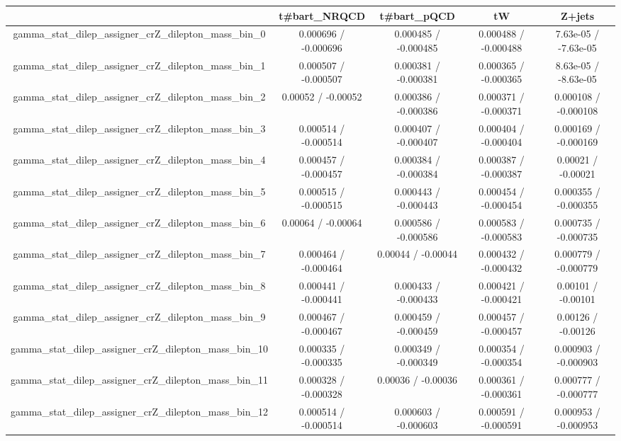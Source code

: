 \documentclass[10pt]{article}
\begin{document}
\begin{table}[htbp]
\begin{center}
\begin{tabular}{|c|c|c|c|c|}
\hline 
      & t#bar{t}_{NRQCD}      & t#bar{t}_{pQCD}      & tW      & Z+jets \\ 
\hline 
  gamma_stat_dilep_assigner_crZ_dilepton_mass_bin_0 & 0.000696 / -0.000696 & 0.000485 / -0.000485 & 0.000488 / -0.000488 & 7.63e-05 / -7.63e-05 \\ 
  gamma_stat_dilep_assigner_crZ_dilepton_mass_bin_1 & 0.000507 / -0.000507 & 0.000381 / -0.000381 & 0.000365 / -0.000365 & 8.63e-05 / -8.63e-05 \\ 
  gamma_stat_dilep_assigner_crZ_dilepton_mass_bin_2 & 0.00052 / -0.00052 & 0.000386 / -0.000386 & 0.000371 / -0.000371 & 0.000108 / -0.000108 \\ 
  gamma_stat_dilep_assigner_crZ_dilepton_mass_bin_3 & 0.000514 / -0.000514 & 0.000407 / -0.000407 & 0.000404 / -0.000404 & 0.000169 / -0.000169 \\ 
  gamma_stat_dilep_assigner_crZ_dilepton_mass_bin_4 & 0.000457 / -0.000457 & 0.000384 / -0.000384 & 0.000387 / -0.000387 & 0.00021 / -0.00021 \\ 
  gamma_stat_dilep_assigner_crZ_dilepton_mass_bin_5 & 0.000515 / -0.000515 & 0.000443 / -0.000443 & 0.000454 / -0.000454 & 0.000355 / -0.000355 \\ 
  gamma_stat_dilep_assigner_crZ_dilepton_mass_bin_6 & 0.00064 / -0.00064 & 0.000586 / -0.000586 & 0.000583 / -0.000583 & 0.000735 / -0.000735 \\ 
  gamma_stat_dilep_assigner_crZ_dilepton_mass_bin_7 & 0.000464 / -0.000464 & 0.00044 / -0.00044 & 0.000432 / -0.000432 & 0.000779 / -0.000779 \\ 
  gamma_stat_dilep_assigner_crZ_dilepton_mass_bin_8 & 0.000441 / -0.000441 & 0.000433 / -0.000433 & 0.000421 / -0.000421 & 0.00101 / -0.00101 \\ 
  gamma_stat_dilep_assigner_crZ_dilepton_mass_bin_9 & 0.000467 / -0.000467 & 0.000459 / -0.000459 & 0.000457 / -0.000457 & 0.00126 / -0.00126 \\ 
  gamma_stat_dilep_assigner_crZ_dilepton_mass_bin_10 & 0.000335 / -0.000335 & 0.000349 / -0.000349 & 0.000354 / -0.000354 & 0.000903 / -0.000903 \\ 
  gamma_stat_dilep_assigner_crZ_dilepton_mass_bin_11 & 0.000328 / -0.000328 & 0.00036 / -0.00036 & 0.000361 / -0.000361 & 0.000777 / -0.000777 \\ 
  gamma_stat_dilep_assigner_crZ_dilepton_mass_bin_12 & 0.000514 / -0.000514 & 0.000603 / -0.000603 & 0.000591 / -0.000591 & 0.000953 / -0.000953 \\ 

\end{tabular}
\end{center}
\end{table}
\end{document}
